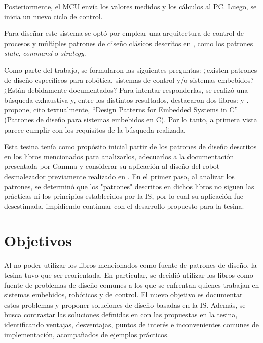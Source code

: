 Posteriormente, el MCU envía los valores medidos y los cálculos al PC. Luego, se inicia un nuevo ciclo de control.

Para diseñar este sistema se optó por emplear una arquitectura de control de procesos \cite[pág. 27]{ShawGarlan1996} y múltiples patrones de diseño clásicos descritos en \cite{Gamma:1995:DPE:186897}, como los patrones \textit{state}, \textit{command} o \textit{strategy}.

Como parte del trabajo, se formularon las siguientes preguntas: ¿existen patrones de diseño específicos para robótica, sistemas de control y/o sistemas embebidos? ¿Están debidamente documentados? Para intentar responderlas, se realizó una búsqueda exhaustiva y, entre los distintos resultados, destacaron dos libros: \cite{douglass} y \cite{elecia-embedded}. \cite{douglass} propone, cito textualmente, ``Design Patterns for Embedded Systems in C'' (Patrones de diseño para sistemas embebidos en C). Por lo tanto, a primera vista parece cumplir con los requisitos de la búsqueda realizada.

Esta tesina tenía como propósito inicial partir de los patrones de diseño descritos en los libros mencionados para analizarlos, adecuarlos a la documentación presentada por Gamma \cite{Gamma:1995:DPE:186897} y considerar su aplicación al diseño del robot desmalezador previamente realizado en \cite{laura}. En el primer paso, al analizar los patrones, se determinó que los "patrones" descritos en dichos libros no siguen las prácticas ni los principios establecidos por la IS, por lo cual su aplicación fue desestimada, impidiendo continuar con el desarrollo propuesto para la tesina.

\section*{Objetivos}

Al no poder utilizar los libros mencionados como fuente de patrones de diseño, la tesina tuvo que ser reorientada. En particular, se decidió utilizar los libros como fuente de problemas de diseño comunes a los que se enfrentan quienes trabajan en sistemas embebidos, robóticos y de control. El nuevo objetivo es documentar estos problemas y proponer soluciones de diseño basadas en la IS. Además, se busca contrastar las soluciones definidas en \cite{douglass} con las propuestas en la tesina, identificando ventajas, desventajas, puntos de interés e inconvenientes comunes de implementación, acompañados de ejemplos prácticos.


